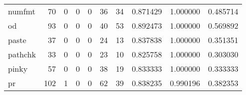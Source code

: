 \begin{tabular}{lrrrrrrrrr}
numfmt    &                                        70 &                                                  0 &                                                  0 &                                                  0 &                                                 36 &                                                 34 &                                           0.871429 &                               1.000000 &                             0.485714 \\
od        &                                        93 &                                                  0 &                                                  0 &                                                  0 &                                                 40 &                                                 53 &                                           0.892473 &                               1.000000 &                             0.569892 \\
paste     &                                        37 &                                                  0 &                                                  0 &                                                  0 &                                                 24 &                                                 13 &                                           0.837838 &                               1.000000 &                             0.351351 \\
pathchk   &                                        33 &                                                  0 &                                                  0 &                                                  0 &                                                 23 &                                                 10 &                                           0.825758 &                               1.000000 &                             0.303030 \\
pinky     &                                        57 &                                                  0 &                                                  0 &                                                  0 &                                                 38 &                                                 19 &                                           0.833333 &                               1.000000 &                             0.333333 \\
pr        &                                       102 &                                                  1 &                                                  0 &                                                  0 &                                                 62 &                                                 39 &                                           0.838235 &                               0.990196 &                             0.382353 \\

\end{tabular}
